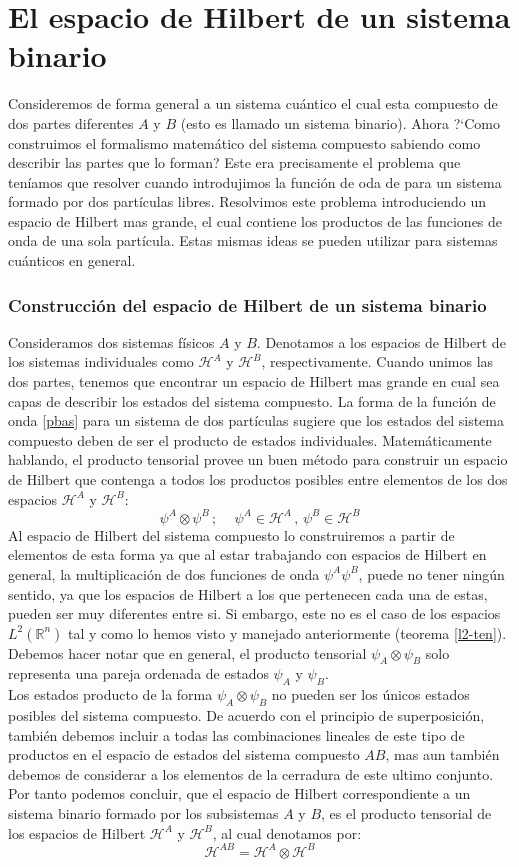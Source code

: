 \documentclass[12pt]{book}
\numberwithin{equation}{chapter}
\def\R{\mathbb{R}}
\def\H{\mathcal{H}}
\def\pr{\otimes}
\begin{document}
\section{El espacio de Hilbert de un sistema binario}
Consideremos de forma general a un sistema cu\'antico el cual esta compuesto de dos partes diferentes $A$ y $B$ (esto es llamado un sistema binario). Ahora ?`Como construimos el formalismo matem\'atico del sistema compuesto sabiendo como describir las partes que lo forman? Este era precisamente el problema que ten\'iamos que resolver cuando introdujimos la funci\'on de oda de para un sistema formado por dos part\'iculas libres. Resolvimos este problema introduciendo un espacio de Hilbert mas grande, el cual contiene los productos de las funciones de onda de una sola part\'icula.  Estas mismas ideas se pueden utilizar para sistemas cu\'anticos en general.

\subsubsection{Construcci\'on del espacio de Hilbert de un sistema binario}
Consideramos dos sistemas f\'isicos $A$ y $B$. Denotamos a los espacios de Hilbert de los sistemas individuales como $\H^{A}$ y $\H^{B}$, respectivamente. Cuando unimos las dos partes, tenemos que encontrar un espacio de Hilbert mas grande en cual sea capas de describir los estados del sistema compuesto. La forma de la funci\'on de onda \eqref{pbas} para un sistema de dos part\'iculas sugiere que los estados del sistema compuesto deben de ser el producto de estados individuales. Matem\'aticamente hablando, el producto tensorial provee un buen m\'etodo para construir un espacio de Hilbert que contenga a todos los productos posibles entre elementos de los dos espacios $\H^{A}$ y $\H^{B}$:
$$ \psi^{A} \pr \psi^{B} \,;\,\,\,\,\,\,\, \psi^{A} \in \H^{A} \,,\, \psi^{B} \in \H^{B} $$
Al espacio de Hilbert del sistema compuesto lo construiremos a partir de elementos de esta forma ya que al estar trabajando con espacios de Hilbert en general, la multiplicaci\'on de dos funciones de onda $\psi^{A} \psi^{B}$, puede no tener ning\'un sentido, ya que los espacios de Hilbert a los que pertenecen cada una de estas, pueden ser muy diferentes entre si. Si embargo, este no es el caso de los espacios $L^{2}(\R^{n})$ tal y como lo hemos visto y manejado anteriormente (teorema \ref{l2-ten}). Debemos hacer notar que en general, el producto tensorial $ \psi_{A} \otimes \psi_{B} $ solo representa una pareja ordenada de estados $\psi_{A}$ y $\psi_{B}$.\\
Los estados producto de la forma $ \psi_{A} \otimes \psi_{B} $ no pueden ser los \'unicos estados posibles del sistema compuesto. De acuerdo con el principio de superposici\'on, tambi\'en debemos incluir a todas las combinaciones lineales de este tipo de productos en el espacio de estados del sistema compuesto $AB$, mas aun tambi\'en debemos de considerar a los elementos de la cerradura de este ultimo conjunto. Por tanto podemos concluir, que el espacio de Hilbert correspondiente a un sistema binario formado por los subsistemas $A$ y $B$, es el producto tensorial de los espacios de Hilbert $\H^{A}$ y $\H^{B}$, al cual denotamos por:
$$ \H^{AB}= \H^{A} \otimes \H^{B} $$
\end{document}
